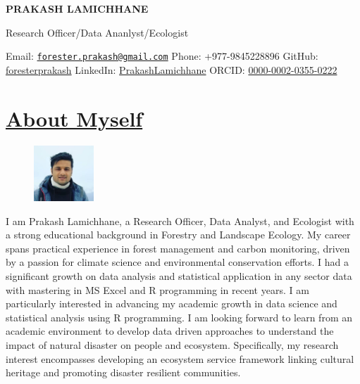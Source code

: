 \documentclass[
]{article}
\author{}
\date{\vspace{-2.5em}}
\begin{document}
\begin{centering}

\Large

{\bf PRAKASH LAMICHHANE}

\normalsize
Research Officer/Data Ananlyst/Ecologist

\end{centering}

\normalsize

Email:
\href{mailto:forester.prakash@gmail.com}{\nolinkurl{forester.prakash@gmail.com}}
\textbar{} Phone: +977-9845228896 \textbar{} GitHub:
\href{https://github.com/foresterprakash}{foresterprakash} \textbar{}
LinkedIn:
\href{https://www.linkedin.com/in/PrakashLamichhane}{PrakashLamichhane}
\textbar{} ORCID:
\href{https://orcid.org/0000-0002-0355-0222}{0000-0002-0355-0222}

\section{\texorpdfstring{\underline{About Myself}}{}}\label{section}

\begin{figure}
    \includegraphics[width=0.2\textwidth]{Photo_Prakash.jpg}
\end{figure}

I am Prakash Lamichhane, a Research Officer, Data Analyst, and Ecologist
with a strong educational background in Forestry and Landscape Ecology.
My career spans practical experience in forest management and carbon
monitoring, driven by a passion for climate science and environmental
conservation efforts. I had a significant growth on data analysis and
statistical application in any sector data with mastering in MS Excel
and R programming in recent years. I am particularly interested in
advancing my academic growth in data science and statistical analysis
using R programming. I am looking forward to learn from an academic
environment to develop data driven approaches to understand the impact
of natural disaster on people and ecosystem. Specifically, my research
interest encompasses developing an ecosystem service framework linking
cultural heritage and promoting disaster resilient communities.
\end{document}
